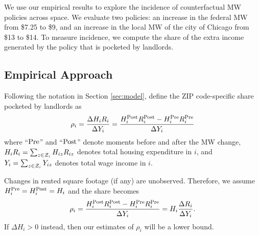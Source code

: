 
We use our empirical results to explore the incidence of counterfactual 
MW policies across space.
We evaluate two policies:
an increase in the federal MW from \$7.25 to \$9, and
an increase in the local MW of the city of Chicago from \$13 to \$14.
To measure incidence, we compute the share of the extra income generated by the 
policy that is pocketed by landlords.

\subsection{Empirical Approach}\label{sec:emp_cf}

Following the notation in Section \ref{sec:model}, define the ZIP code-specific 
share pocketed by landlords as
\begin{equation*}
    \rho_i = \frac{\Delta H_i R_i}{\Delta Y_i} 
           = \frac{H^{\text{Post}}_i R^{\text{Post}}_i - H^{\text{Pre}}_i R^{\text{Pre}}_i}{\Delta Y_i} 
\end{equation*}
where
``$\text{Pre}$'' and ``$\text{Post}$'' denote moments before and after the MW change,
$H_i R_i = \sum_{z\in\mathcal{Z}_i} H_{iz} R_{iz}$ denotes total housing expenditure 
in $i$, and
$Y_i = \sum_{z\in\mathcal{Z}_i} Y_{iz}$ denotes total wage income in $i$.

Changes in rented square footage (if any) are unobserved.
Therefore, we assume $H^{\text{Pre}}_i = H^{\text{Post}}_i = H_i$ and the share becomes
\begin{equation}\label{eq:share_pocketed}
    \rho_i = \frac{H^{\text{Post}}_i R^{\text{Post}}_i - H^{\text{Pre}}_i R^{\text{Pre}}_i}{\Delta Y_i} = 
                H_i \frac{\Delta R_i}{\Delta Y_i} .
\end{equation}
If $\Delta H_i > 0$ instead, then our estimates of $\rho_i$ will be a lower 
bound.

